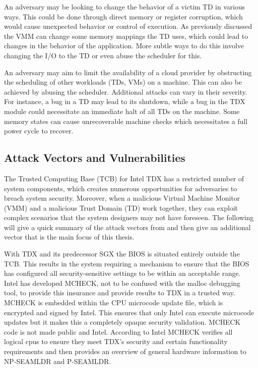 
An adversary may be looking to change the behavior of a victim TD in various ways. This could be done through direct memory or register corruption, which would cause unexpected behavior or control of execution. As previously discussed the VMM can change some memory mappings the TD uses, which could lead to changes in the behavior of the application. More subtle ways to do this involve changing the I/O to the TD or even abuse the scheduler for this. 


An adversary may aim to limit the availability of a cloud provider by obstructing the scheduling of other workloads (TDs, VMs) on a machine. This can also be achieved by abusing the scheduler. Additional attacks can vary in their severity. For instance, a bug in a TD may lead to its shutdown, while a bug in the TDX module could necessitate an immediate halt of all TDs on the machine. Some memory states can cause unrecoverable machine checks which necessitates a full power cycle to recover\cite{aktas_intel_nodate}.

\subsection{Attack Vectors and Vulnerabilities}

The Trusted Computing Base (TCB) for Intel TDX has a restricted number of system components, which creates numerous opportunities for adversaries to breach system security. Moreover, when a malicious Virtual Machine Monitor (VMM) and a malicious Trust Domain (TD) work together, they can exploit complex scenarios that the system designers may not have foreseen. The following will give a quick summary of the attack vectors from \cite{aktas_intel_nodate} and then give an additional vector that is the main focus of this thesis.  



With TDX and its predecessor SGX the BIOS is situated entirely outside the TCB. This results in the system requiring a mechanism to ensure that the BIOS has configured all security-sensitive settings to be within an acceptable range. Intel has developed MCHECK, not to be confused with the malloc debugging tool, to provide this insurance and provide results to TDX in a trusted way.  MCHECK is embedded within the CPU microcode update file, which is encrypted and signed by Intel. This ensures that only Intel can execute microcode updates but it makes this a completely opaque security validation. MCHECK code is not made public and Intel. According to Intel MCHECK verifies \guillemotright all logical cpus to ensure they meet TDX's security and certain functionality requirements \guillemotleft\cite[p.~50]{noauthor_tdx-module-10-public-specpdf_nodate} and then provides an overview of general hardware information to \Gls{NP-SEAMLDR} and \Gls{P-SEAMLDR}. 

